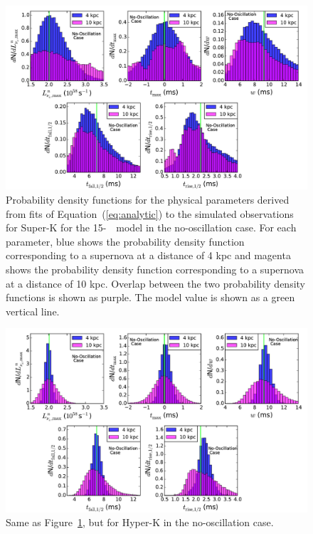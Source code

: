 \begin{figure}[h]
\centerline{\includegraphics[width=.943\linewidth]{wh07_15_40g_SuperK_realparameters_histogram.pdf}}
\caption{\label{fig:superkphysicalparms_hist} 
 Probability density
 functions  for the physical
  parameters derived from fits of Equation~(\ref{eq:analytic}) to the 
simulated observations for Super-K for the 
15-\Msol\ \ls\ model in the no-oscillation case.  
For each parameter, blue shows the 
probability density function corresponding to a supernova
at a distance of 4 kpc and magenta shows the probability density function
corresponding to a supernova at a distance of
10 kpc.  Overlap between the two probability density 
functions is shown as purple.  The
model value is shown as a green vertical line.}
\end{figure}


\begin{figure}[h]
\centerline{\includegraphics[width=0.943\linewidth]{wh07_15_40g_HyperK_realparameters_histogram.pdf}}
\caption{\label{fig:hyperkphysicalparms_hist} Same as
  Figure~\ref{fig:superkphysicalparms_hist}, but for Hyper-K in the
  no-oscillation case.}
\end{figure}


